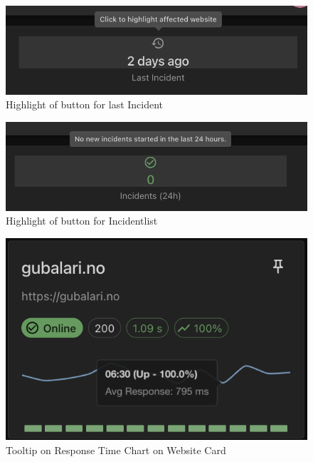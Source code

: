 \begin{figure}
    \centering
    \includegraphics[width=1\linewidth]{figures/final_application/last_incident_button_highlight.png}
    \caption{Highlight of button for last Incident}
    \label{fig:app_recentincident_button}
\end{figure}

\begin{figure}
    \centering
    \includegraphics[width=1\linewidth]{figures/final_application/incidentlist_button_highlight.png}
    \caption{Highlight of button for Incidentlist}
    \label{fig:app_incidentlist_button}
\end{figure}

\begin{figure}
    \centering
    \includegraphics[width=1\linewidth]{figures/final_application/tooltip_responsetime_chart_card.png}
    \caption{Tooltip on Response Time Chart on Website Card}
    \label{fig:app_tooltip_cardchart}
\end{figure}

